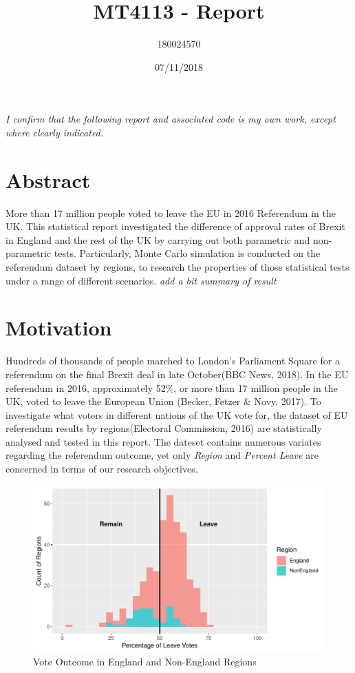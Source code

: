 \documentclass[]{article}
\title{MT4113 - Report}
\author{180024570}
\date{07/11/2018}
\begin{document}
\maketitle

\emph{I conﬁrm that the following report and associated code is my own
work, except where clearly indicated.}

\newpage

\section*{\centering Abstract}

More than 17 million people voted to leave the EU in 2016 Referendum in
the UK. This statistical report investigated the difference of approval
rates of Brexit in England and the rest of the UK by carrying out both
parametric and non-parametric tests. Particularly, Monte Carlo
simulation is conducted on the referendum dataset by regions, to
research the properties of those statistical tests under a range of
different scenarios. \emph{add a bit summary of result}

\newpage

\hypertarget{motivation}{%
\section{Motivation}\label{motivation}}

Hundreds of thousands of people marched to London's Parliament Square
for a referendum on the final Brexit deal in late October(BBC News,
2018). In the EU referendum in 2016, approximately 52\%, or more than 17
million people in the UK, voted to leave the European Union (Becker,
Fetzer \& Novy, 2017). To investigate what voters in different nations
of the UK vote for, the dataset of EU referendum results by
regions(Electoral Commission, 2016) are statistically analysed and
tested in this report. The dateset contains numerous variates regarding
the referendum outcome, yet only \emph{Region} and \emph{Percent Leave}
are concerned in terms of our research objectives.

\begin{figure}
\centering
\includegraphics{../figure/datasetHist.pdf}
\caption{Vote Outcome in England and Non-England Regions}
\end{figure}
\end{document}
